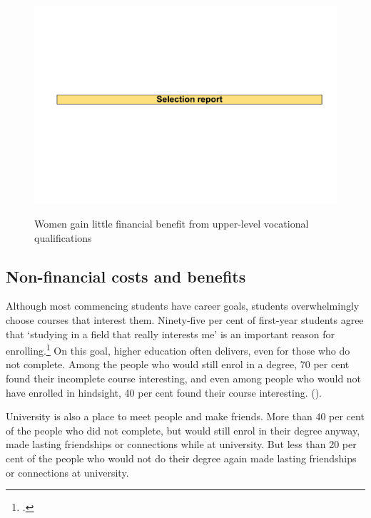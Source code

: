                 \begin{figure}
                    \caption{Women gain little financial benefit from upper-level vocational qualifications\label{fig:11}}%
                    \includegraphics[page=14]{atlas/selection_chartdeck.pdf} 
                    {\textcite{ABS2017f}}
                \end{figure}


\subsection{Non-financial costs and benefits}\label{subsec:2.1.3}

Although most commencing students have career goals, students overwhelmingly choose courses that interest them. Ninety-five per cent of first-year students agree that `studying in a field that really interests me' is an important reason for enrolling.\footcite[][24]{Baik2015} On this goal, higher education often delivers, even for those who do not complete. Among the people who would still enrol in a degree, 70 per cent found their incomplete course interesting, and even among people who would not have enrolled in hindsight, 40 per cent found their course interesting. ().

University is also a place to meet people and make friends. More than 40 per cent of the people who did not complete, but would still enrol in their degree anyway, made lasting friendships or connections while at university. But less than 20 per cent of the people who would not do their degree again made lasting friendships or connections at university.

